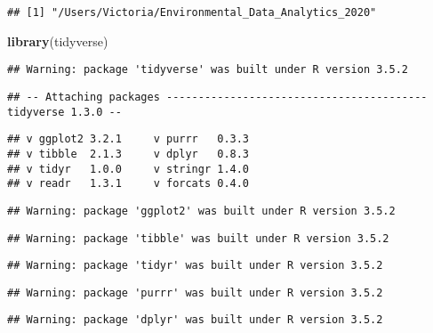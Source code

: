 \documentclass[]{article}
\newenvironment{Shaded}{\begin{snugshade}}{\end{snugshade}}
\newcommand{\KeywordTok}[1]{\textcolor[rgb]{0.13,0.29,0.53}{\textbf{#1}}}
\newcommand{\CommentTok}[1]{\textcolor[rgb]{0.56,0.35,0.01}{\textit{#1}}}
\newcommand{\NormalTok}[1]{#1}
\begin{document}
\begin{Shaded}
\end{Shaded}

\begin{verbatim}
## [1] "/Users/Victoria/Environmental_Data_Analytics_2020"
\end{verbatim}

\begin{Shaded}
\begin{Highlighting}[]
\KeywordTok{library}\NormalTok{(tidyverse)}
\end{Highlighting}
\end{Shaded}

\begin{verbatim}
## Warning: package 'tidyverse' was built under R version 3.5.2
\end{verbatim}

\begin{verbatim}
## -- Attaching packages ----------------------------------------- tidyverse 1.3.0 --
\end{verbatim}

\begin{verbatim}
## v ggplot2 3.2.1     v purrr   0.3.3
## v tibble  2.1.3     v dplyr   0.8.3
## v tidyr   1.0.0     v stringr 1.4.0
## v readr   1.3.1     v forcats 0.4.0
\end{verbatim}

\begin{verbatim}
## Warning: package 'ggplot2' was built under R version 3.5.2
\end{verbatim}

\begin{verbatim}
## Warning: package 'tibble' was built under R version 3.5.2
\end{verbatim}

\begin{verbatim}
## Warning: package 'tidyr' was built under R version 3.5.2
\end{verbatim}

\begin{verbatim}
## Warning: package 'purrr' was built under R version 3.5.2
\end{verbatim}

\begin{verbatim}
## Warning: package 'dplyr' was built under R version 3.5.2
\end{verbatim}
\end{document}
